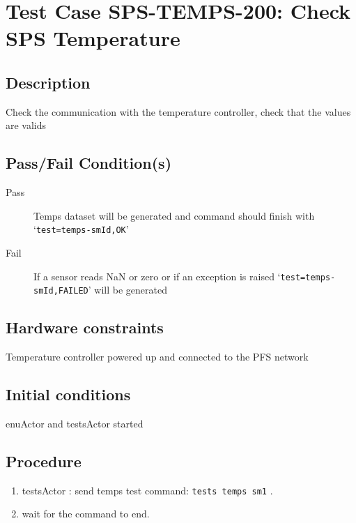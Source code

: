 \section{Test Case SPS-TEMPS-200: Check SPS Temperature}

\subsection{Description}

Check the communication with the temperature controller, check that the values are valids

\subsection{Pass/Fail Condition(s)}

\begin{description}
\item [Pass] Temps dataset will be generated and command should finish with `\texttt{test=temps-smId,OK}'
\item [Fail] If a sensor reads NaN or zero or if an exception is raised `\texttt{test=temps-smId,FAILED}' will be generated
\end{description}

\subsection{Hardware constraints}

Temperature controller powered up and connected to the PFS network

\subsection{Initial conditions}
enuActor and testsActor started

\subsection{Procedure}

\begin{enumerate}
    \item testsActor : send temps test command: \texttt{tests temps sm1} .
    \item wait for the command to end.
\end{enumerate}